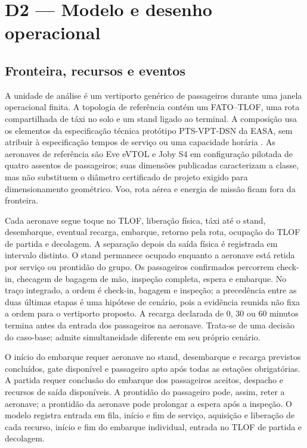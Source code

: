 \section{D2 — Modelo e desenho operacional}

\subsection{Fronteira, recursos e eventos}

A unidade de análise é um vertiporto genérico de passageiros durante uma janela operacional finita. A topologia de referência contém um FATO--TLOF, uma rota compartilhada de táxi no solo e um stand ligado ao terminal. A composição usa os elementos da especificação técnica protótipo PTS-VPT-DSN da EASA, sem atribuir à especificação tempos de serviço ou uma capacidade horária \citep{easa2022ptsvptdsn}. As aeronaves de referência são Eve eVTOL e Joby S4 em configuração pilotada de quatro assentos de passageiros; suas dimensões publicadas caracterizam a classe, mas não substituem o diâmetro certificado de projeto exigido para dimensionamento geométrico. Voo, rota aérea e energia de missão ficam fora da fronteira.

Cada aeronave segue toque no TLOF, liberação física, táxi até o stand, desembarque, eventual recarga, embarque, retorno pela rota, ocupação do TLOF de partida e decolagem. A separação depois da saída física é registrada em intervalo distinto. O stand permanece ocupado enquanto a aeronave está retida por serviço ou prontidão do grupo. Os passageiros confirmados percorrem check-in, checagem de bagagem de mão, inspeção completa, espera e embarque. No traço integrado, a ordem é check-in, bagagem e inspeção; a precedência entre as duas últimas etapas é uma hipótese de cenário, pois a evidência reunida não fixa a ordem para o vertiporto proposto. A recarga declarada de 0, 30 ou 60 minutos termina antes da entrada dos passageiros na aeronave. Trata-se de uma decisão do caso-base; \citet{preis2023} admite simultaneidade diferente em seu próprio cenário.

O início do embarque requer aeronave no stand, desembarque e recarga previstos concluídos, gate disponível e passageiro apto após todas as estações obrigatórias. A partida requer conclusão do embarque dos passageiros aceitos, despacho e recursos de saída disponíveis. A prontidão do passageiro pode, assim, reter a aeronave; a prontidão da aeronave pode prolongar a espera após a inspeção. O modelo registra entrada em fila, início e fim de serviço, aquisição e liberação de cada recurso, início e fim do embarque individual, entrada no TLOF de partida e decolagem.

